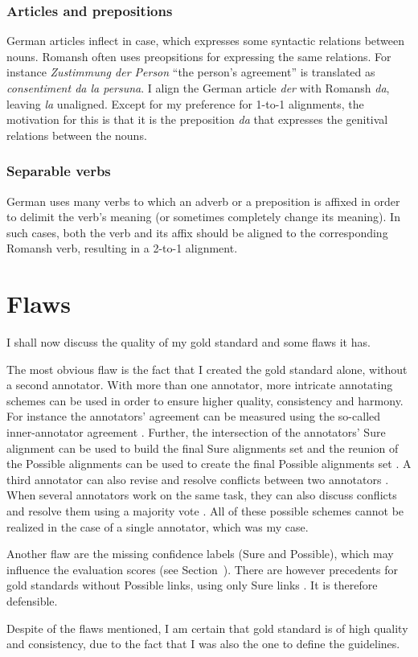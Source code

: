 \subsubsection{Articles and prepositions}
German articles inflect in case, which expresses some syntactic relations between nouns. 
Romansh often uses preopsitions for expressing the same relations. 
For instance \emph{Zustimmung der Person} \enquote{the person's agreement} is translated as \emph{consentiment da la persuna}. 
I align the German article \emph{der} with Romansh \emph{da}, leaving \emph{la} unaligned. 
Except for my preference for 1-to-1 alignments, the motivation for this is that it is the preposition \emph{da} that expresses the genitival relations between the nouns.

\subsubsection{Separable verbs}
German uses many verbs to which an adverb or a preposition is affixed in order to delimit the verb's meaning (or sometimes completely change its meaning). 
In such cases, both the verb and its affix should be aligned to the corresponding Romansh verb, resulting in a 2-to-1 alignment.

\section{Flaws}
\label{sec:gold-flaws}
I shall now discuss the quality of my gold standard and some flaws it has.

The most obvious flaw is the fact that I created the gold standard alone, without a second annotator. 
With more than one annotator, more intricate annotating schemes can be used in order to ensure higher quality, consistency and harmony. 
For instance the annotators' agreement can be measured using the so-called inner-annotator agreement \autocite{holmqvist-ahrenberg-2011-gold}. 
Further, the intersection of the annotators' Sure alignment can be used to build the final Sure alignments set and the reunion of the Possible alignments can be used to create the final Possible alignments set \autocite{mihalcea-pedersen-2003-evaluation}.
A third annotator can also revise and resolve conflicts between two annotators \autocite{mihalcea-pedersen-2003-evaluation}.
When several annotators work on the same task, they can also discuss conflicts and resolve them using a majority vote \autocite{DBLP:journals/corr/cmp-lg-9805004}.
All of these possible schemes cannot be realized in the case of a single annotator, which was my case.

Another flaw are the missing confidence labels (Sure and Possible), which may influence the evaluation scores (see Section~). 
There are however precedents for gold standards without Possible links, using only Sure links \autocites{clematide2018,mihalcea-pedersen-2003-evaluation}. It is therefore defensible.


Despite of the flaws mentioned, I am certain that gold standard is of high quality and consistency, due to the fact that I was also the one to define the guidelines. 


